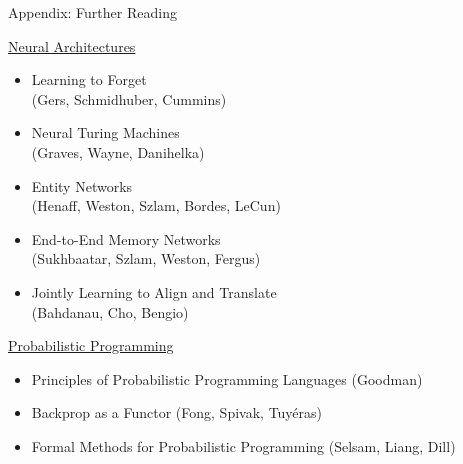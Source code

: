 \documentclass{beamer}
\begin{document}
\begin{frame}{Appendix: Further Reading}
	\begin{minipage}{0.49\textwidth}
	\underline{\alert{Neural Architectures}}
	\begin{itemize}
	\item \alert{Learning to Forget}\\ (Gers, Schmidhuber, Cummins)
	\item \alert{Neural Turing Machines}\\ (Graves, Wayne, Danihelka)
	\item \alert{Entity Networks}\\ (Henaff, Weston, Szlam, Bordes, LeCun)
	\item \alert{End-to-End Memory Networks}\\ (Sukhbaatar, Szlam, Weston, Fergus)	
	\end{itemize}
	\end{minipage}
	\begin{minipage}{0.49\textwidth}
	\begin{itemize}	
	\item \alert{Jointly Learning to Align and Translate}\\ (Bahdanau, Cho, Bengio)
	\end{itemize}
	\underline{\alert{Probabilistic Programming}}
	\begin{itemize}
	\item \alert{Principles of Probabilistic Programming Languages} (Goodman)
	\item \alert{Backprop as a Functor} (Fong, Spivak, Tuyéras)
	\item \alert{Formal Methods for Probabilistic Programming} (Selsam, Liang, Dill)
	\end{itemize}
	\end{minipage}
\end{frame}
\end{document}

